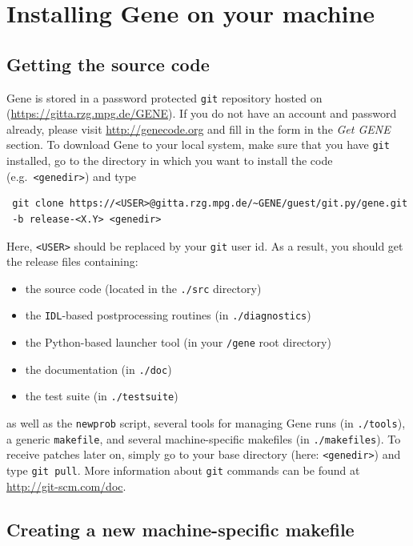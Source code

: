 \documentclass[12pt]{article}
\begin{document}
\newpage

\section{Installing Gene on your machine}

\subsection{Getting the source code}

{\sc Gene} is stored in a password protected {\tt git} repository hosted on
(\url{https://gitta.rzg.mpg.de/GENE}). If you do not have an account and password already,
please visit \url{http://genecode.org} and fill in the form in the {\em Get GENE} section.
To download {\sc Gene} to your local system, make sure that you have {\tt git} installed, go to the
directory in which you want to install the code (e.g.~\texttt{<genedir>}) and type
\begin{small}
\begin{verbatim}
 git clone https://<USER>@gitta.rzg.mpg.de/~GENE/guest/git.py/gene.git
 -b release-<X.Y> <genedir>
\end{verbatim}
\end{small}
Here, {\tt <USER>} should be replaced by your {\tt git} user id. As a result, you should get the release files containing:
\begin{itemize}
\item the \gene source code (located in the \texttt{./src} directory)
\item the {\tt IDL}-based postprocessing routines (in \texttt{./diagnostics})
\item the Python-based launcher tool (in your \texttt{/gene} root directory)
\item the \gene documentation (in \texttt{./doc})
\item the \gene test suite (in \texttt{./testsuite})
\end{itemize}
as well as the {\tt newprob} script, several tools for managing {\sc Gene} runs (in \texttt{./tools}),
a generic {\tt makefile}, and several machine-specific makefiles (in \texttt{./makefiles}).
To receive patches later on, simply go to your \gene base directory (here: \texttt{<genedir>}) and type
\verb|git pull|. More information about {\tt git} commands can be found at \\
\url{http://git-scm.com/doc}.

\subsection{Creating a new machine-specific makefile}
\end{document}
